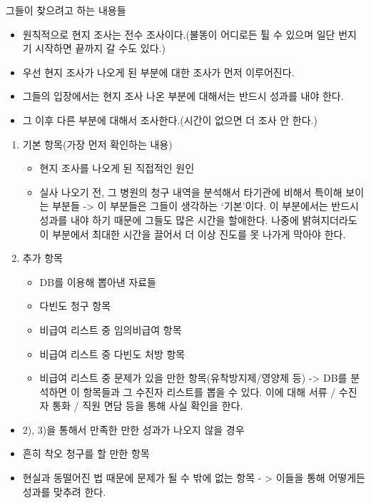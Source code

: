 \Large{그들이 찾으려고 하는 내용들}\normalsize
\par
\medskip
{}
\begin{itemize}\tightlist
\item 원칙적으로 현지 조사는 전수 조사이다.(불똥이 어디로든 튈 수 있으며 일단 번지기 시작하면 끝까지 갈 수도 있다.)
\item 우선 현지 조사가 나오게 된 부분에 대한 조사가 먼저 이루어진다.
\item 그들의 입장에서는 현지 조사 나온 부분에 대해서는 반드시 성과를 내야 한다.
\item 그 이후 다른 부분에 대해서 조사한다.(시간이 없으면 더 조사 안 한다.)
\end{itemize}


\begin{enumerate}[①]\tightlist
\item 기본 항목(가장 먼저 확인하는 내용)
	\begin{itemize}\tightlist
	\item 현지 조사를 나오게 된 직접적인 원인 
	\item 실사 나오기 전, 그 병원의 청구 내역을 분석해서 타기관에 비해서 특이해 보이는 부분들 \newline
-> 이 부분들은 그들이 생각하는 ‘기본’이다. 이 부분에서는 반드시 성과를 내야 하기 때문에 그들도 많은 시간을 할애한다. 나중에 밝혀지더라도 이 부분에서 최대한 시간을 끌어서 더 이상 진도를 못 나가게 막아야 한다.
	\end{itemize}
\item 추가 항목
	\begin{itemize}\tightlist
	\item DB를 이용해 뽑아낸 자료들
	\item 다빈도 청구 항목 
	\item 비급여 리스트 중 임의비급여 항목
	\item 비급여 리스트 중 다빈도 처방 항목
	\item 비급여 리스트 중 문제가 있을 만한 항목(유착방지제/영양제 등) \newline
-> DB를 분석하면 이 항목들과 그 수진자 리스트를 뽑을 수 있다. 이에 대해 서류 / 수진자 통화 / 직원 면담 등을 통해 사실 확인을 한다.
	\end{itemize}
\end{enumerate} 

\begin{itemize}\tightlist
\item 2), 3)을 통해서 만족한 만한 성과가 나오지 않을 경우
\item 흔히 착오 청구를 할 만한 항목
\item 현실과 동떨어진 법 때문에 문제가 될 수 밖에 없는 항목 \newline
 - > 이들을 통해 어떻게든 성과를 맞추려 한다. 
\end{itemize}

